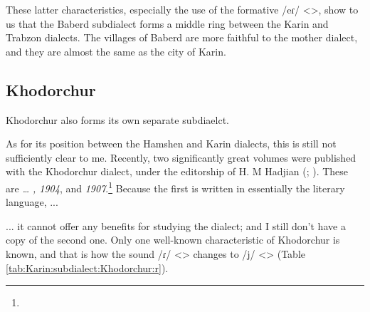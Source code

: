 These latter characteristics, especially the use of the formative /eɾ/ <>, show to us that the Baberd subdialect forms a middle ring between the Karin and Trabzon dialects. The villages of Baberd are more faithful to the mother dialect, and they are almost the same as the city of Karin. 
\subsection{Khodorchur}
Khodorchur also forms its own separate subdiaelct. 


As for its position between the Hamshen and Karin dialects, this is still not sufficiently clear to me. Recently, two significantly great volumes were published with the Khodorchur dialect, under the editorship of H. M Hadjian (; ). These are \textit{… , 1904}, and \textit{ 1907}.\footnote{} Because the first is written in essentially the literary language, ... 


\begin{adjarianpage}\label{page:113}\end{adjarianpage}%

... it cannot offer any benefits for studying the dialect; and I still don't have a copy of the second one. Only one well-known characteristic of Khodorchur is known, and that is how the sound /ɾ/ <> changes to /j/ <> (Table \ref{tab:Karin:subdialect:Khodorchur:r}). 

